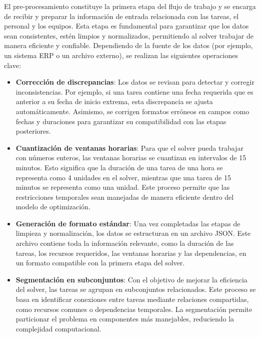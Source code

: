 \documentclass{article}
\begin{document}
El pre-procesamiento constituye la primera etapa del flujo de trabajo y se encarga de recibir y preparar la información de entrada relacionada con las tareas, el personal y los equipos. Esta etapa es fundamental para garantizar que los datos sean consistentes, estén limpios y normalizados, permitiendo al solver trabajar de manera eficiente y confiable. Dependiendo de la fuente de los datos (por ejemplo, un sistema ERP o un archivo externo), se realizan las siguientes operaciones clave:

\begin{itemize}
    \item \textbf{Corrección de discrepancias}: Los datos se revisan para detectar y corregir inconsistencias. Por ejemplo, si una tarea contiene una fecha requerida que es anterior a su fecha de inicio extrema, esta discrepancia se ajusta automáticamente. Asimismo, se corrigen formatos erróneos en campos como fechas y duraciones para garantizar su compatibilidad con las etapas posteriores.

    \item \textbf{Cuantización de ventanas horarias}: Para que el solver pueda trabajar con números enteros, las ventanas horarias se cuantizan en intervalos de 15 minutos. Esto significa que la duración de una tarea de una hora se representa como 4 unidades en el solver, mientras que una tarea de 15 minutos se representa como una unidad. Este proceso permite que las restricciones temporales sean manejadas de manera eficiente dentro del modelo de optimización.
    
    \item \textbf{Generación de formato estándar}: Una vez completadas las etapas de limpieza y normalización, los datos se estructuran en un archivo JSON. Este archivo contiene toda la información relevante, como la duración de las tareas, los recursos requeridos, las ventanas horarias y las dependencias, en un formato compatible con la primera etapa del solver.

    \item \textbf{Segmentación en subconjuntos}: Con el objetivo de mejorar la eficiencia del solver, las tareas se agrupan en subconjuntos relacionados. Este proceso se basa en identificar conexiones entre tareas mediante relaciones compartidas, como recursos comunes o dependencias temporales. La segmentación permite particionar el problema en componentes más manejables, reduciendo la complejidad computacional.

\end{itemize}
\end{document}
